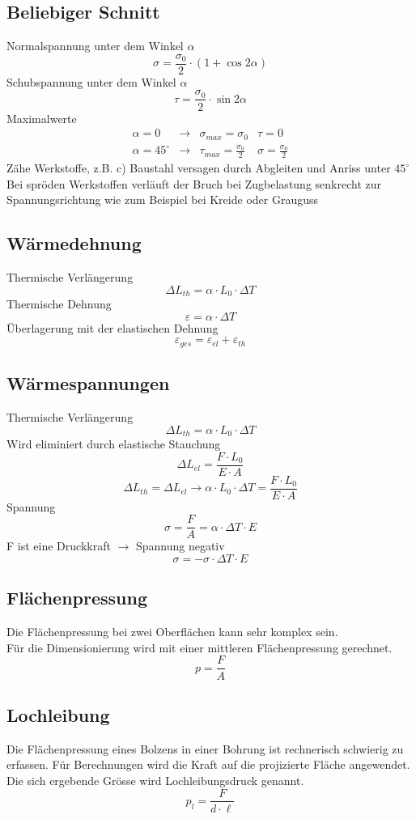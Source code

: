 \subsection{Beliebiger Schnitt}
Normalspannung unter dem Winkel $\alpha$
\[ \sigma = \frac{\sigma_0}{2} \cdot (1 + \cos 2 \alpha) \]
Schubspannung unter dem Winkel $\alpha$
\[ \tau = \frac{\sigma_0}{2} \cdot \sin 2 \alpha \]
Maximalwerte
\[ \begin{array}{llll}
\alpha = 0 & \rightarrow & \sigma_{max} = \sigma_0 & \tau = 0\\
\alpha = 45^{\circ} & \rightarrow & \tau_{max} = \frac{\sigma_0}{2} & \sigma = \frac{\sigma_0}{2}
\end{array} \]
Zähe Werkstoffe, z.B. c) Baustahl versagen durch Abgleiten und Anriss unter $45^{\circ}$\\
Bei spröden Werkstoffen verläuft der Bruch bei Zugbelastung senkrecht zur Spannungsrichtung wie zum Beispiel bei Kreide oder Grauguss 

\subsection{Wärmedehnung}
Thermische Verlängerung
\[ \Delta L_{th} = \alpha \cdot L_0 \cdot \Delta T \]
Thermische Dehnung
\[ \varepsilon = \alpha \cdot \Delta T \]
Überlagerung mit der elastischen Dehnung
\[ \varepsilon_{ges} = \varepsilon_{el} + \varepsilon_{th} \]

\subsection{Wärmespannungen}
Thermische Verlängerung
\[ \Delta L_{th} = \alpha \cdot L_0 \cdot \Delta T \]
Wird eliminiert durch elastische Stauchung
\[ \Delta L_{el} = \frac{F \cdot L_0}{E \cdot A} \]
\[ \Delta L_{th} = \Delta L_{el} \rightarrow \alpha \cdot L_0 \cdot \Delta T = \frac{F \cdot L_0}{E \cdot A} \]
Spannung
\[ \sigma = \frac{F}{A} = \alpha \cdot \Delta T \cdot E \]
F ist eine Druckkraft $\rightarrow$ Spannung negativ
\[ \sigma = - \sigma \cdot \Delta T \cdot E \]

\subsection{Flächenpressung}
Die Flächenpressung bei zwei Oberflächen kann sehr komplex sein. \\
Für die Dimensionierung wird mit einer mittleren Flächenpressung gerechnet. 
\[ p = \frac{F}{A} \]

\subsection{Lochleibung}
Die Flächenpressung eines Bolzens in einer Bohrung ist rechnerisch schwierig zu erfassen. 
Für Berechnungen  wird die Kraft auf die projizierte Fläche angewendet. Die sich ergebende Grösse wird Lochleibungsdruck genannt. 
\[ p_l = \frac{F}{d \cdot \ell} \]
